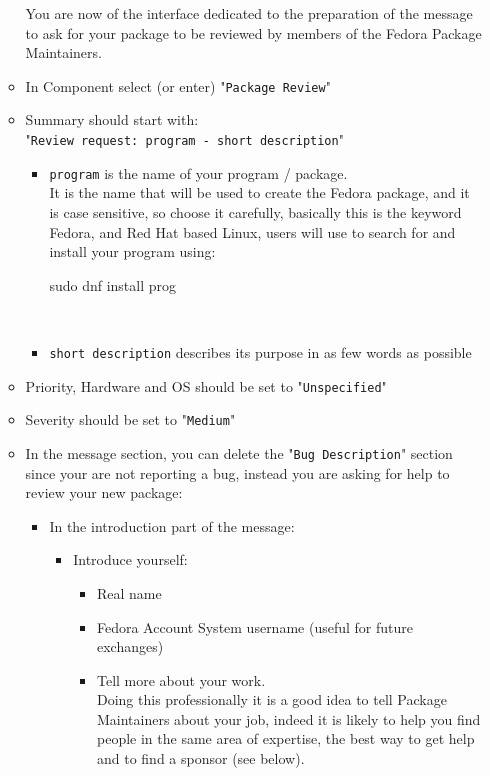 \begin{enumerate}
\begin{itemize}
\begin{center}
\end{center}
You are now of the interface dedicated to the preparation of the message to ask for your package to be reviewed by members of the Fedora Package Maintainers.
\item In Component select (or enter) "\texttt{Package Review}" 
\item Summary should start with:\\[0.25cm]
"\texttt{Review request: program - short description}"\\[-0.4cm]
\begin{itemize}
\item \texttt{program} is the name of your program / package.\\[0.25cm]
It is the name that will be used to create the Fedora package, and it is case sensitive, 
so choose it carefully, basically this is the keyword Fedora, and Red Hat based Linux, users will use to search for and install your program using: \\[-0.75cm]
\begin{scriptiii}
\fprompt{~} sudo dnf install prog
\end{scriptiii}
\\[-0.75cm]
\item \texttt{short description} describes its purpose in as few words as possible\\[-0.25cm] 
\end{itemize}
\item Priority, Hardware and OS should be set to "\texttt{Unspecified}" 
\item Severity should be set to "\texttt{Medium}"
\item In the message section, you can delete the "\texttt{Bug Description}" section since your are not reporting a bug, instead you are asking for help to review your new package: 
\begin{itemize}
\item In the introduction part of the message: 
\begin{itemize}
\item Introduce yourself:
\begin{itemize}
\item Real name
\item Fedora Account System username (useful for future exchanges)
\item Tell more about your work. \\[0.25cm]
Doing this professionally it is a good idea to tell Package Maintainers about your job,
indeed it is likely to help you find people in the same area of expertise, the best way to get help and to find a sponsor (see below). \\[-0.25cm] 

\end{itemize}
\end{itemize}
\end{itemize}
\end{itemize}
\end{enumerate}
